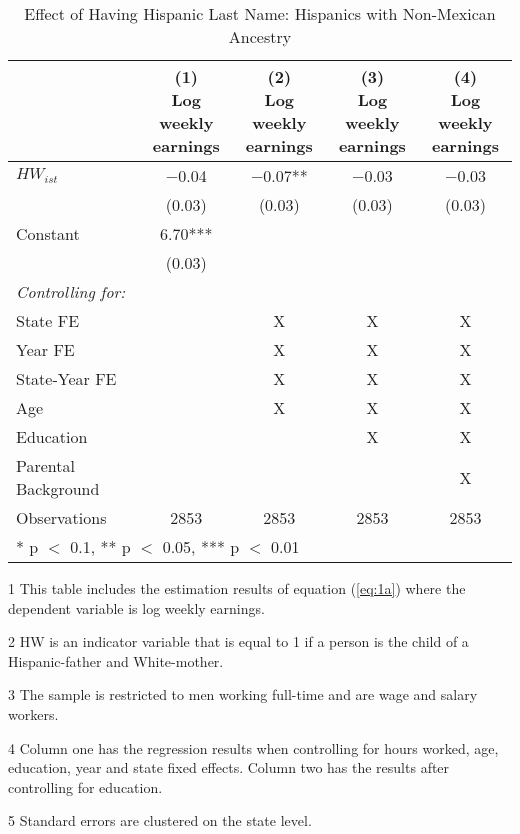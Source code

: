 \begin{table}[H]
\centering\centering
\caption{Effect of Having Hispanic Last Name: Hispanics with Non-Mexican Ancestry  \label{tab:lastnamereg-weekearm-nonmex}}
\centering
\begin{threeparttable}
\begin{tabular}[t]{lcccc}
\toprule
  & \specialcell{(1) \\ Log weekly \\ earnings} & \specialcell{(2) \\ Log weekly \\ earnings} & \specialcell{(3) \\  Log weekly \\ earnings} & \specialcell{(4) \\  Log weekly \\ earnings}\\
\midrule
$HW_{ist}$ & \num{-0.04} & \num{-0.07}** & \num{-0.03} & \num{-0.03}\\
 & (\num{0.03}) & (\num{0.03}) & (\num{0.03}) & (\num{0.03})\\
Constant & \num{6.70}*** &  &  & \\
 & (\num{0.03}) &  &  & \\
\midrule
\textit{Controlling for:} &  &  &  & \\
State FE &  & X & X & X\\
Year FE &  & X & X & X\\
State-Year FE &  & X & X & X\\
Age &  & X & X & X\\
Education &  &  & X & X\\
Parental Background &  &  &  & X\\
Observations & \num{2853} & \num{2853} & \num{2853} & \num{2853}\\
\bottomrule
\multicolumn{5}{l}{\rule{0pt}{1em}* p $<$ 0.1, ** p $<$ 0.05, *** p $<$ 0.01}\\
\end{tabular}
\begin{tablenotes}
\item[1] {\footnotesize{This table includes the estimation results of equation (\ref{eq:1a}) where the dependent variable is log weekly earnings.}}
\item[2] {\footnotesize{HW is an indicator variable that is equal to 1 if a person is the child of a Hispanic-father and White-mother.}}
\item[3] {\footnotesize{The sample is restricted to men working full-time and are wage and salary workers.}}
\item[4] {\footnotesize{Column one has the regression results when controlling for hours worked, age, education, year and state fixed effects. Column two has the results after controlling for education.}}
\item[5] {\footnotesize{Standard errors are clustered on the state level.}}
\end{tablenotes}
\end{threeparttable}
\end{table}
